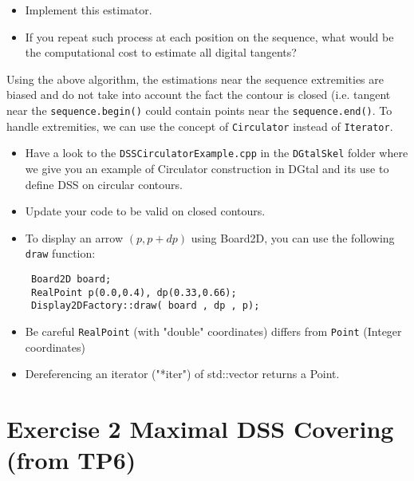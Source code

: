 \documentclass[a4paper, 11pt]{article}
\begin{document}
\smallskip
{}
	\begin{itemize}
	\item Implement this estimator.
	\item If you repeat such process at each position on the sequence, what would be the computational cost to estimate all digital tangents?
	\end{itemize}

\vspace{0.7cm}
\par Using the above algorithm, the estimations near the sequence extremities are biased and do not take into account the fact the contour is closed (i.e. tangent near the \texttt{sequence.begin()} could contain points near the \texttt{sequence.end()}. To handle extremities, we can use the concept of \texttt{Circulator} instead of \texttt{Iterator}.

\smallskip
{}
	\begin{itemize}
	\item Have a look to the \texttt{DSSCirculatorExample.cpp} in the \texttt{DGtalSkel} folder where we give you an example of Circulator construction in DGtal and its use to define DSS on circular contours.
	\item Update your code to be valid on closed contours.
	\end{itemize}

\bigskip

\begin{itemize}
	\item To display an arrow $(p,p+dp)$  using Board2D, you can use the following  \texttt{draw} function:
\begin{verbatim}
 Board2D board;
 RealPoint p(0.0,0.4), dp(0.33,0.66); 
 Display2DFactory::draw( board , dp , p);
\end{verbatim}
	\item Be careful \texttt{RealPoint} (with "double" coordinates) differs from \texttt{Point} (Integer coordinates)
	\item Dereferencing an iterator ("*iter") of std::vector returns a Point.
\end{itemize}



\section*{Exercise 2 \rm Maximal DSS Covering (from TP6)}
\end{document}
